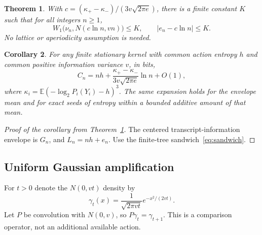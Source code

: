 \documentclass[11pt,a4paper]{article}
\newtheorem{theorem}{Theorem}[section]
\newtheorem{corollary}[theorem]{Corollary}
\theoremstyle{definition}\newtheorem{definition}[theorem]{Definition}
\theoremstyle{remark}\newtheorem{remark}[theorem]{Remark}
\newcommand{\E}{\mathbb E}
\numberwithin{equation}{section}
\begin{document}
\begin{theorem}\label{log:thm:main}
With $c=(\kappa_+-\kappa_-)/(3v\sqrt{2\pi e})$, there is a finite
constant $K$ such that for all integers $n\ge1$,
\begin{equation}\label{log:eq:main}
 \boxed{W_1\bigl(\nu_n,N(c\ln n,vn)\bigr)\le K,
 \qquad |e_n-c\ln n|\le K.}
\end{equation}
No lattice or aperiodicity assumption is needed.
\end{theorem}

\begin{corollary}\label{log:cor:cost}
For any finite stationary kernel with common action entropy $h$ and
common positive information variance $v$, in bits,
\[
 \boxed{C_n=nh+\frac{\kappa_+-\kappa_-}{3v\sqrt{2\pi e}}\ln n+O(1),}
\]
where $\kappa_i=\E(-\log_2P_i(Y_i)-h)^3$. The same expansion holds
for the envelope mean and for exact seeds of entropy within a bounded
additive amount of that mean.
\end{corollary}
\begin{proof}[Proof of the corollary from Theorem~\ref{log:thm:main}]
The centered transcript-information envelope is $G_n$, and
$L_n=nh+e_n$. Use the finite-tree sandwich~\eqref{eq:sandwich}.
\end{proof}


\subsection{Uniform Gaussian amplification}
For $t>0$ denote the $N(0,vt)$ density by
\[
 \gamma_t(x)=\frac{1}{\sqrt{2\pi vt}}e^{-x^2/(2vt)}.
\]
Let $P$ be convolution with $N(0,v)$, so $P\gamma_t=\gamma_{t+1}$.
This is a comparison operator, not an additional available action.
\end{document}
